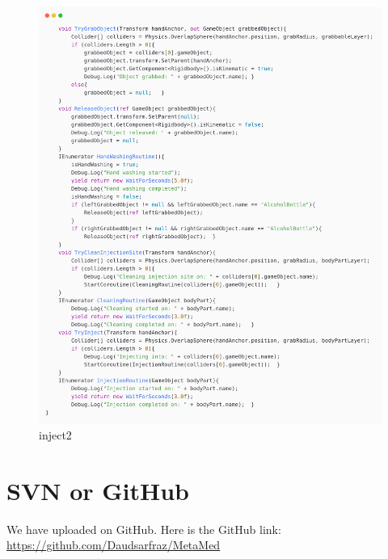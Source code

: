 \begin{figure}[h] 
	\centering
	\includegraphics[width=1\textwidth, height=0.7\textheight]{Images/inject2.png}
	\caption{inject2}
	\label{fig:Hands Washing}
\end{figure}

\section{SVN or GitHub}
We have uploaded on GitHub. Here is the GitHub link: \\
\href{https://github.com/Daudsarfraz/MetaMed}{https://github.com/Daudsarfraz/MetaMed}